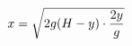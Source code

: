 \documentclass[preview]{standalone}
\begin{document}
\begin{align*}
\special{dvisvgm:raw <g id='unique000'>}x = \sqrt{2 g ( H - y ) \cdot \frac{2 y}{g}}\special{dvisvgm:raw </g>}
\end{align*}
\end{document}
